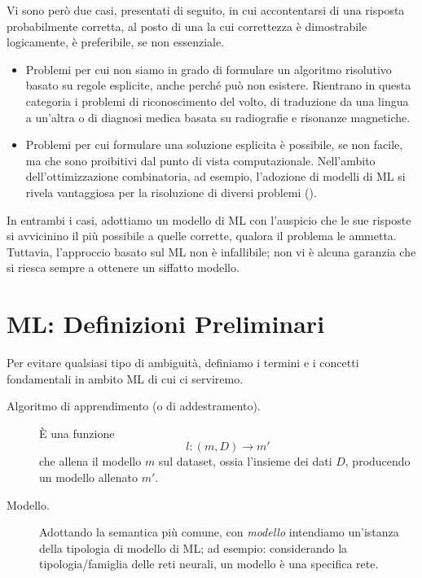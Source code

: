 Vi sono però due casi, presentati di seguito, in cui accontentarsi di una risposta probabilmente corretta, al posto di una la cui correttezza è dimostrabile logicamente, è preferibile, se non essenziale.
\begin{itemize}
    \item Problemi per cui non siamo in grado di formulare un algoritmo risolutivo basato su regole esplicite, anche perché può non esistere. Rientrano in questa categoria i problemi di riconoscimento del volto, di traduzione da una lingua a un'altra o di diagnosi medica basata su radiografie e risonanze magnetiche.
    
    \item Problemi per cui formulare una soluzione esplicita è possibile, se non facile, ma che sono proibitivi dal punto di vista computazionale. Nell'ambito dell'ottimizzazione combinatoria, ad esempio, l'adozione di modelli di ML si rivela vantaggiosa per la risoluzione di diversi problemi (\cite{bengio2021optim}).
\end{itemize}

In entrambi i casi, adottiamo un modello di ML con l'auspicio che le sue risposte si avvicinino il più possibile a quelle corrette, qualora il problema le ammetta. Tuttavia, l'approccio basato sul ML non è infallibile; non vi è alcuna garanzia che si riesca sempre a ottenere un siffatto modello.
    
\section{ML: Definizioni Preliminari}
\label{par:tassonomia}

Per evitare qualsiasi tipo di ambiguità, definiamo i termini e i concetti fondamentali in ambito ML di cui ci serviremo.

\begin{description}
    \item[Algoritmo di apprendimento (o di addestramento).] È una funzione 
    \begin{equation}
        l:(m, D) \rightarrow m'
    \end{equation}
    che allena il modello $m$ sul dataset, ossia l'insieme dei dati $D$, producendo un modello allenato $m'$.
    
    \item[Modello.] Adottando la semantica più comune, con \textit{modello} intendiamo un'istanza della tipologia di modello di ML; ad esempio: considerando la tipologia/famiglia delle reti neurali, un modello è una specifica rete.
    
\end{description}

